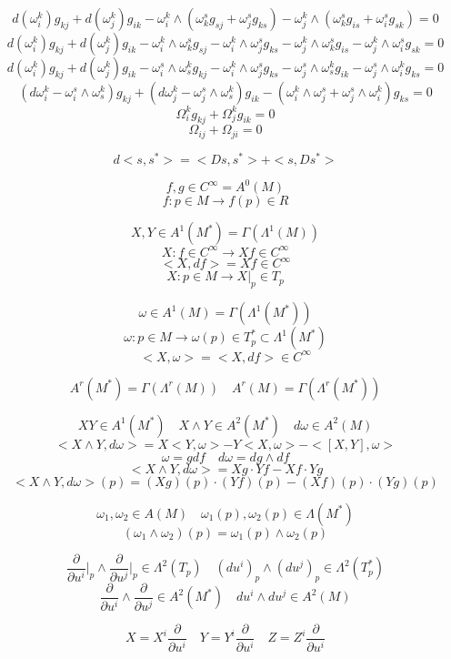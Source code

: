 \documentclass[12pt,a4paper]{article}
\begin{document}
\[
d(\omega^k_i)g_{kj} + d(\omega^k_j)g_{ik}- \omega^k_i\wedge (\omega^s_kg_{sj}+\omega^s_jg_{ks} ) - \omega^k_j \wedge (\omega^s_kg_{is} + \omega^s_ig_{sk}) = 0
\]
\[
d(\omega^k_i)g_{kj} + d(\omega^k_j)g_{ik}- 
\omega^k_i\wedge \omega^s_kg_{sj}- \omega^k_i\wedge\omega^s_jg_{ks} - 
\omega^k_j \wedge \omega^s_kg_{is} - \omega^k_j \wedge\omega^s_ig_{sk} = 0
\]
\[
d(\omega^k_i)g_{kj} + d(\omega^k_j)g_{ik}- 
\omega^s_i\wedge \omega^k_sg_{kj}- \omega^k_i\wedge\omega^s_jg_{ks} - 
\omega^s_j \wedge \omega^k_sg_{ik} - \omega^s_j \wedge\omega^k_ig_{ks} = 0
\]
\[
(d\omega^k_i-\omega^s_i\wedge \omega^k_s) g_{kj} + (d\omega^k_j-\omega^s_j \wedge \omega^k_s)g_{ik}- (\omega^k_i\wedge\omega^s_j+\omega^s_j \wedge\omega^k_i)g_{ks} = 0
\]
\[
\Omega^k_i g_{kj} + \Omega^k_j g_{ik} = 0
\]
\[
\Omega_{ij} + \Omega_{ji} = 0
\]

\[
d < s, s^*> = <Ds, s^*> + <s,Ds^*>
\]

\[
f,g \in C^{\infty}=A^0(M)
\]
\[
f: p\in M \rightarrow f(p) \in R
\]

\[
X,Y \in A^1(M^*) = \Gamma(\Lambda^1(M))
\]
\[
X: f \in C^{\infty} \rightarrow Xf \in C^{\infty}
\]
\[
<X,df> =Xf \in C^{\infty}
\]
\[
X: p \in M \rightarrow X|_p \in T_p
\]

\[
\omega \in A^1(M) = \Gamma(\Lambda^1(M^*))
\]
\[
\omega: p \in M \rightarrow \omega(p) \in T^*_p \subset \Lambda^1(M^*)
\]
\[
<X,\omega> = <X,df> \in C^{\infty}
\]

\[
A^r(M^*) = \Gamma(\Lambda^r(M)) \quad A^r(M) = \Gamma(\Lambda^r(M^*))
\]

\[
XY \in A^1(M^*) \quad X \wedge Y \in A^2(M^*)  \quad d\omega \in A^2(M) 
\]
\[
<X\wedge Y,d\omega> = X<Y,\omega> - Y<X,\omega> - <[X,Y],\omega>
\]
\[
\omega = g df \quad d\omega = dg \wedge df
\]
\[
<X\wedge Y,d\omega> = Xg \cdot Yf - Xf \cdot Yg
\]
\[
<X\wedge Y,d\omega>(p) = (Xg)(p) \cdot (Yf)(p)- (Xf)(p) \cdot (Yg)(p)
\]

\[
\omega_1, \omega_2 \in A(M) \quad \omega_1(p), \omega_2(p) \in \Lambda(M^*)
\]
\[
(\omega_1 \wedge \omega_2 )(p) = \omega_1(p) \wedge \omega_2(p)
\]

\[
\frac{\partial}{\partial u^i}\bigg|_p \wedge \frac{\partial}{\partial u^j}\bigg|_p \in \Lambda^2(T_p) \quad (du^i)_p\wedge(du^j)_p \in \Lambda^2(T_p^*)
\]
\[
\frac{\partial}{\partial u^i} \wedge \frac{\partial}{\partial u^j} \in A^2(M^*) \quad du^i \wedge du^j \in A^2(M)
\]


\[
X = X^i \frac{\partial}{\partial u^i} \quad Y = Y^i \frac{\partial}{\partial u^i} \quad Z = Z^i \frac{\partial}{\partial u^i} 
\]
\end{document}

